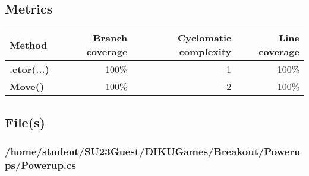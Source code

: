 \documentclass[a4paper,landscape,10pt]{article}
\begin{document}
\subsection{Metrics}
\begin{longtable}[l]{|l|r|r|r|}
\hline
\textbf{Method} & \textbf{Branch coverage} & \textbf{Cyclomatic complexity} & \textbf{Line coverage}\\
\hline
\textbf{.ctor(...)} & 100\% & 1 & 100\%\\
\hline
\textbf{Move()} & 100\% & 2 & 100\%\\
\hline
\end{longtable}
\subsection{File(s)}
\subsubsection{/home/student/SU23Guest/DIKUGames/Breakout/Powerups/Powerup.cs}
\end{document}
